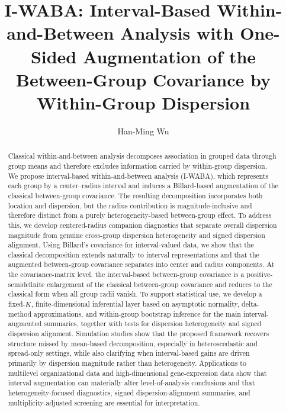 \documentclass[preprint, times, 12pt, authoryear]{elsarticle}
\begin{document}
\begin{frontmatter}
	
\title{I-WABA: Interval-Based Within-and-Between Analysis with One-Sided Augmentation of the Between-Group Covariance by Within-Group Dispersion}
\author{Han-Ming Wu}
\address{Department of Statistics, National Chengchi University, Taipei City 11605, Taiwan}

\begin{abstract}
	Classical within-and-between analysis decomposes association in grouped data through group means and therefore excludes information carried by within-group dispersion. We propose interval-based within-and-between analysis (I-WABA), which represents each group by a center--radius interval and induces a Billard-based augmentation of the classical between-group covariance. The resulting decomposition incorporates both location and dispersion, but the radius contribution is magnitude-inclusive and therefore distinct from a purely heterogeneity-based between-group effect. To address this, we develop centered-radius companion diagnostics that separate overall dispersion magnitude from genuine cross-group dispersion heterogeneity and signed dispersion alignment. Using Billard's covariance for interval-valued data, we show that the classical decomposition extends naturally to interval representations and that the augmented between-group covariance separates into center and radius components. At the covariance-matrix level, the interval-based between-group covariance is a positive-semidefinite enlargement of the classical between-group covariance and reduces to the classical form when all group radii vanish. To support statistical use, we develop a fixed-\(K\), finite-dimensional inferential layer based on asymptotic normality, delta-method approximations, and within-group bootstrap inference for the main interval-augmented summaries, together with tests for dispersion heterogeneity and signed dispersion alignment. Simulation studies show that the proposed framework recovers structure missed by mean-based decomposition, especially in heteroscedastic and spread-only settings, while also clarifying when interval-based gains are driven primarily by dispersion magnitude rather than heterogeneity. Applications to multilevel organizational data and high-dimensional gene-expression data show that interval augmentation can materially alter level-of-analysis conclusions and that heterogeneity-focused diagnostics, signed dispersion-alignment summaries, and multiplicity-adjusted screening are essential for interpretation.
\end{abstract}


\end{frontmatter}
\end{document}
